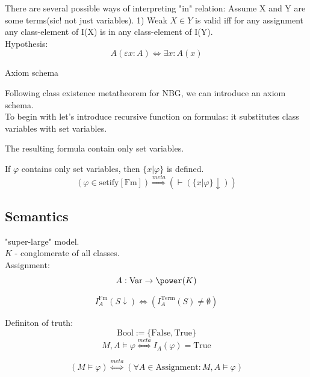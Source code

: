 There are several possible ways of interpreting "in" relation: 
Assume X and Y are some terms(sic! not just variables).
1) Weak
$X\in Y$ is valid iff for any assignment any class-element of I(X) is in any class-element of I(Y).\\

Hypothesis:
\[A(\varepsilon x: A)\iff \exists x: A(x)\]




Axiom schema



Following class existence metatheorem for NBG, we can introduce an axiom schema.\\
To begin with let's introduce recursive function on formulas: it substitutes class variables with set variables.


The resulting formula contain only set variables.



If $\varphi$ contains only set variables, then 
$\{x | \varphi\}$ is defined.
\[(\varphi\in\mathrm{setify}[\mathrm{Fm}])\stackrel{meta}{\Longrightarrow} ( \vdash (\{x | \varphi\}\downarrow)) \]

\subsection{Semantics}
"super-large" model.\\
$K$ - conglomerate of all classes.\\

Assignment:\\
\[A:\mbox{Var}\to \power(K)\]

\[I^{\mathrm{Fm}}_A(S\downarrow) \iff (I^{\mathrm{Term}}_A(S)\neq\emptyset)\]

Definiton of truth:
\[\mbox{Bool} := \{\mbox{False}, \mbox{True}\}\]
\[M,A\vDash \varphi \stackrel{meta}{\Longleftrightarrow} I_A(\varphi)=\mbox{True}\]

\[(M\vDash \varphi) \stackrel{meta}{\Longleftrightarrow} (\forall A\in \mbox{Assignment}: M,A\vDash \varphi)\]


%

